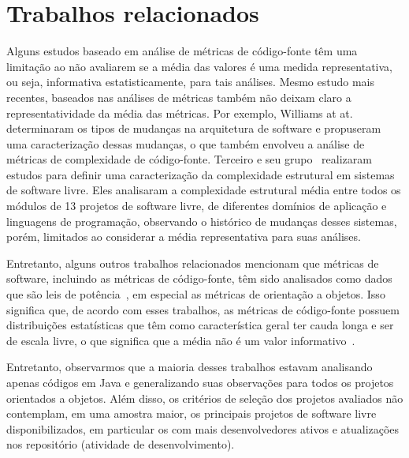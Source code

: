 \documentclass{llncs}
\begin{document}


\section{Trabalhos relacionados}

Alguns estudos baseado em análise de métricas de código-fonte têm uma limitação
ao não avaliarem se a média das valores é uma medida representativa, ou seja,
informativa estatisticamente, para tais
análises\cite{meirelles2013monitoramento}.
%
Mesmo estudo mais recentes, baseados nas análises de métricas também não deixam
claro a representatividade da média das métricas. Por exemplo, Williams at
at.\cite{williams2010} determinaram os tipos de mudanças na arquitetura de
software e propuseram uma caracterização dessas mudanças, o que também envolveu
a análise de métricas de complexidade de código-fonte.
%
Terceiro e seu grupo~\cite{terceiro2009, terceiro2012:csmr, terceiro2010:dcoss,
terceiro2010:core-periphery} realizaram estudos para definir uma caracterização
da complexidade estrutural em sistemas de software livre.
%
Eles analisaram a complexidade estrutural média entre todos os módulos de 13
projetos de software livre, de diferentes domínios de aplicação e linguagens de
programação, observando o histórico de mudanças desses sistemas, porém,
limitados ao considerar a média representativa para suas análises.
%

Entretanto, alguns outros trabalhos relacionados mencionam que métricas de
software, incluindo as métricas de código-fonte, têm sido analisados como dados
que são leis de potência~\cite{clauset2007}, em especial as métricas de
orientação a objetos.
%
Isso significa que, de acordo com esses trabalhos, as métricas de código-fonte
possuem distribuições estatísticas que têm como característica geral ter cauda
longa e ser de escala livre, o que significa que a média não é um valor
informativo~\cite{clauset2007}.

Entretanto, observarmos que a maioria desses trabalhos estavam analisando
apenas códigos em Java e generalizando suas observações para todos os projetos
orientados a objetos.
%
Além disso, os critérios de seleção dos projetos avaliados não contemplam, em
uma amostra maior, os principais projetos de software livre disponibilizados,
em particular os com mais desenvolvedores ativos e atualizações nos repositório
(atividade de desenvolvimento).
\end{document}
